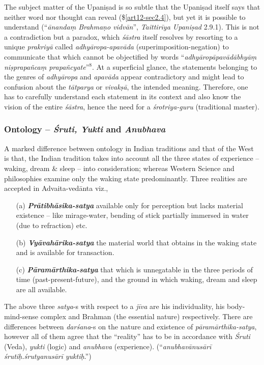 The subject matter of the Upaniṣad is so subtle that the Upaniṣad itself says that neither word nor thought can reveal (\$\ref{art12-sec2.4}), but yet it is possible to understand (``{\sl ānandaṃ Brahmaṇo vidvān}'', {\sl Taittirīya Upaniṣad} 2.9.1). This is not a contradiction but a paradox, which {\sl śāstra} itself resolves by resorting to a unique {\sl prakriyā} called {\sl adhyāropa-apavāda} (superimposition-negation) to communicate that which cannot be objectiﬁed by words ``{\sl adhyāropāpavādābhyāṃ niṣprapañcaṃ prapañcyate}''$^{8}$. At a superﬁcial glance, the statements belonging to the genres of {\sl adhyāropa} and {\sl apavāda} appear contradictory and might lead to confusion about the {\sl tātparya} or {\sl vivakṣā}, the intended meaning. Therefore, one has to carefully understand each statement in its context and also know the vision of the entire {\sl śāstra}, hence the need for a {\sl śrotriya-guru} (traditional master).

\subsubsection{Ontology -- {{\sl\bfseries Śruti, Yukti}\relax} and {{\sl\bfseries Anubhava}\relax}}

A marked diﬀerence between ontology in Indian traditions and that of the West is that, the Indian tradition takes into account all the three states of experience -- waking, dream \& sleep -- into consideration; whereas Western Science and philosophies examine only the waking state predominantly. Three realities are accepted in Advaita-vedānta viz.,
\begin{itemize}
\item[(a)] {{\sl\bfseries Prātibhāsika-satya}\relax}  available only for perception but lacks material existence -- like mirage-water, bending of stick partially immersed in water (due to refraction) etc.

\item[(b)] {{\sl\bfseries Vyāvahārika-satya}\relax} the material world that obtains in the waking state and is available for transaction.

\item[(c)] {{\sl\bfseries Pāramārthika-satya}\relax} that which is unnegatable in the three periods of time (past-present-future), and the ground in which waking, dream and sleep are all available.
\end{itemize}

The above three {\sl satya}-s with respect to a {\sl jīva} are his individuality, his body-mind-sense complex and Brahman (the essential nature) respectively. There are diﬀerences between {\sl darśana}-s on the nature and existence of {\sl pāramārthika-satya}, however all of them agree that the ``reality'' has to be in accordance with {\sl Śruti} (Veda), {\sl yukti} (logic) and {\sl anubhava} (experience). (``{\sl anubhavānusārī śrutiḥ.śrutyanusārī yuktiḥ}.'')


